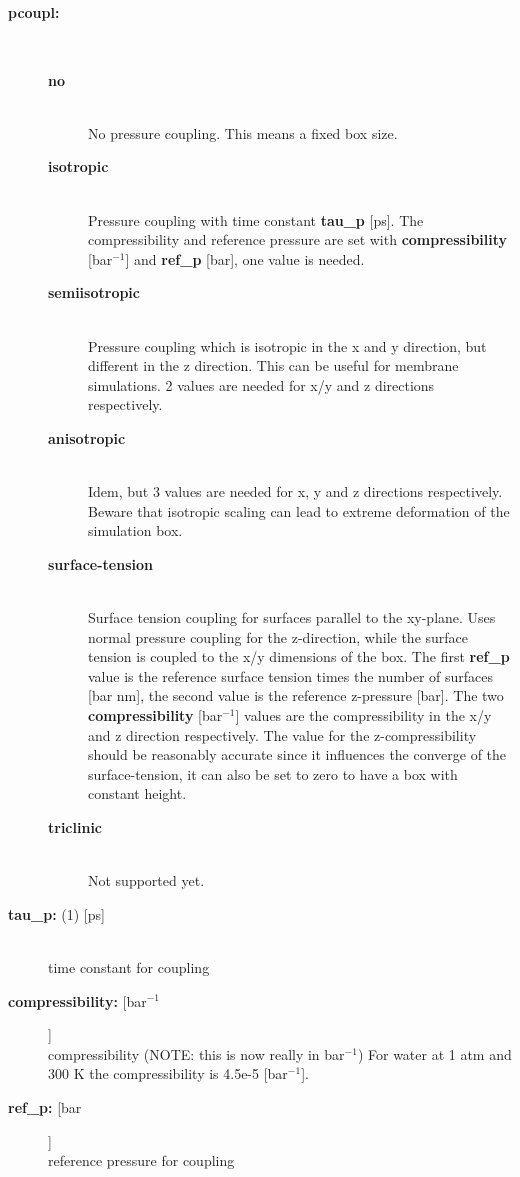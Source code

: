 \subsection{}
\begin{description}
\item[{\bf pcoupl:}]\mbox{}\\
\vspace{-2ex}\begin{description}
\item[{\bf no}]\mbox{}\\
No pressure coupling. This means a fixed box size.
\item[{\bf isotropic}]\mbox{}\\
Pressure coupling with time constant {\bf tau\_p} [ps].
The compressibility and reference pressure are set with
{\bf compressibility} [bar$^{-1}$] and {\bf ref\_p} [bar], one
value is needed.
\item[{\bf semiisotropic}]\mbox{}\\
Pressure coupling which is isotropic in the x and y direction,
but different in the z direction.
This can be useful for membrane simulations.
2 values are needed for x/y and z directions respectively.
\item[{\bf anisotropic}]\mbox{}\\
Idem, but 3 values are needed for x, y and z directions respectively.
Beware that isotropic scaling can lead to extreme deformation
of the simulation box.
\item[{\bf surface-tension}]\mbox{}\\
Surface tension coupling for surfaces parallel to the xy-plane.
Uses normal pressure coupling for the z-direction, while the surface tension
is coupled to the x/y dimensions of the box.
The first {\bf ref\_p} value is the reference surface tension times
the number of surfaces [bar nm], 
the second value is the reference z-pressure [bar].
The two {\bf compressibility} [bar$^{-1}$] values are the compressibility
in the x/y and z direction respectively.
The value for the z-compressibility should be reasonably accurate since it
influences the converge of the surface-tension, it can also be set to zero
to have a box with constant height.
\item[{\bf triclinic}]\mbox{}\\
Not supported yet.
\end{description}
\item[{\bf tau\_p: }(1) {[ps]}]\mbox{}\\
time constant for coupling
\item[{\bf compressibility: }[bar$^{-1}$]]\mbox{}\\
compressibility (NOTE: this is now really in bar$^{-1}$)
For water at 1 atm and 300 K the compressibility is 4.5e-5 [bar$^{-1}$].
\item[{\bf ref\_p: }[bar]]\mbox{}\\
reference pressure for coupling
\end{description}

